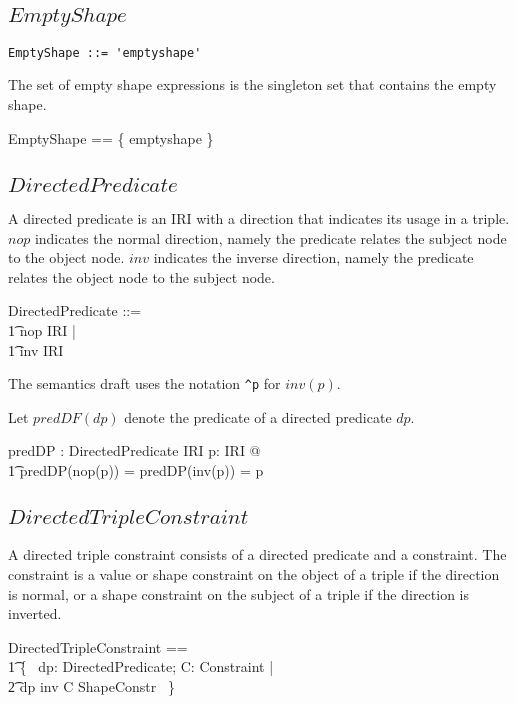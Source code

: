 \documentclass{article}
\begin{document}
\subsection{$EmptyShape$}

\begin{verbatim}
EmptyShape ::= 'emptyshape'
\end{verbatim}

The set of empty shape expressions is the singleton set that contains the empty shape.
\begin{zed}
	EmptyShape == \{ emptyshape \}
\end{zed}

\subsection{$DirectedPredicate$}

A directed predicate is an IRI with a direction that indicates its usage in a triple. 
$nop$ indicates the normal direction, namely the predicate relates the subject node to the object node. 
$inv$ indicates the inverse direction, namely the predicate relates the object node to the subject node.
\begin{zed}
	DirectedPredicate ::= \\
\t1		nop \ldata IRI \rdata | \\
\t1		inv \ldata IRI \rdata
\end{zed}

The semantics draft uses the notation {\tt \verb+^+p} for $inv(p)$.

Let $predDF(dp)$ denote the predicate of a directed predicate $dp$.
\begin{axdef}
	predDP : DirectedPredicate \fun IRI
\where
	\forall p: IRI @ \\
\t1		predDP(nop(p)) = predDP(inv(p)) = p
\end{axdef}

\subsection{$DirectedTripleConstraint$}
A directed triple constraint consists of a directed predicate and a constraint.
The constraint is a value or shape constraint on the object of a triple if the direction is normal, 
or a shape constraint on the subject of a triple if the direction is inverted.
\begin{zed}
	DirectedTripleConstraint == \\
\t1		\{~ dp: DirectedPredicate; C: Constraint | \\
\t2			dp \in \ran inv \implies C \in ShapeConstr ~\}
\end{zed}
\end{document}
